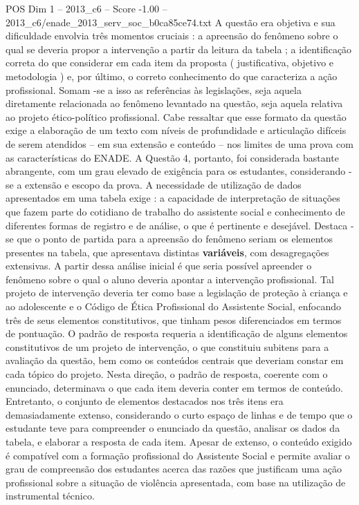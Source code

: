 \begin{textsample}{POS Dim 1 – 2013\_c6 – Score -1.00 – 2013\_c6/enade\_2013\_serv\_soc\_b0ca85ce74.txt}
A questão era objetiva e sua dificuldade envolvia três momentos cruciais : a apreensão do fenômeno sobre o qual se deveria propor a intervenção a partir da leitura da tabela ; a identificação correta do que considerar em cada item da proposta ( justificativa, objetivo e metodologia ) e, por último, o correto conhecimento do que caracteriza a ação profissional.
Somam -se a isso as referências às legislações, seja aquela diretamente relacionada ao fenômeno levantado na questão, seja aquela relativa ao projeto ético-político profissional.
Cabe ressaltar que esse formato da questão exige a elaboração de um texto com níveis de profundidade e articulação difíceis de serem atendidos – em sua extensão e conteúdo – nos limites de uma prova com as características do ENADE.
A Questão 4, portanto, foi considerada bastante abrangente, com um grau elevado de exigência para os estudantes, considerando -se a extensão e escopo da prova.
A necessidade de utilização de dados apresentados em uma tabela exige : a capacidade de interpretação de situações que fazem parte do cotidiano de trabalho do assistente social e conhecimento de diferentes formas de registro e de análise, o que é pertinente e desejável.
Destaca -se que o ponto de partida para a apreensão do fenômeno seriam os elementos presentes na tabela, que apresentava distintas \textbf{variáveis}, com desagregações extensivas.
A partir dessa análise inicial é que seria possível apreender o fenômeno sobre o qual o aluno deveria apontar a intervenção profissional.
Tal projeto de intervenção deveria ter como base a legislação de proteção à criança e ao adolescente e o Código de Ética Profissional do Assistente Social, enfocando três de seus elementos constitutivos, que tinham pesos diferenciados em termos de pontuação.
O padrão de resposta requeria a identificação de alguns elementos constitutivos de um projeto de intervenção, o que constituiu subitens para a avaliação da questão, bem como os conteúdos centrais que deveriam constar em cada tópico do projeto.
Nesta direção, o padrão de resposta, coerente com o enunciado, determinava o que cada item deveria conter em termos de conteúdo.
Entretanto, o conjunto de elementos destacados nos três itens era demasiadamente extenso, considerando o curto espaço de linhas e de tempo que o estudante teve para compreender o enunciado da questão, analisar os dados da tabela, e elaborar a resposta de cada item.
Apesar de extenso, o conteúdo exigido é compatível com a formação profissional do Assistente Social e permite avaliar o grau de compreensão dos estudantes acerca das razões que justificam uma ação profissional sobre a situação de violência apresentada, com base na utilização de instrumental técnico.

\end{textsample}
